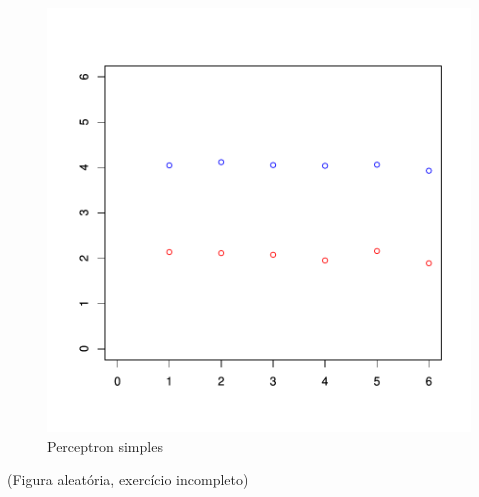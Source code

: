 \documentclass{article}
\begin{document}
\begin{figure}[!htb]
\centering
\includegraphics{1703-003}
\caption{Perceptron simples}
\label{fig:Fig2}
\end{figure}

(Figura aleatória, exercício incompleto)

\end{document}
